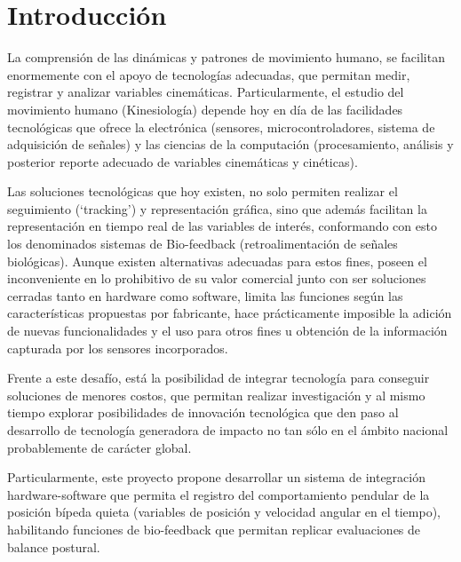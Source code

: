\documentclass[12pt,a4paper]{article}
\begin{document}
\tableofcontents %
\listoffigures
\listoftables

\thispagestyle{empty}
\pagebreak

\let\stdsection\section
\renewcommand\section{\newpage\stdsection}



\section{Introducción}
La comprensión de las dinámicas y patrones de movimiento humano, se facilitan enormemente con el apoyo de tecnologías adecuadas, que permitan medir, registrar y analizar variables cinemáticas. Particularmente, el estudio del movimiento humano (Kinesiología) depende hoy en día de las facilidades tecnológicas que ofrece la electrónica (sensores, microcontroladores, sistema de adquisición de señales) y las ciencias de la computación (procesamiento, análisis y posterior reporte adecuado de  variables cinemáticas y cinéticas).  

Las soluciones tecnológicas que hoy existen, no solo permiten realizar el seguimiento (‘tracking’) y representación gráfica, sino que además facilitan la representación en tiempo real de las variables de interés, conformando con esto los denominados sistemas de Bio-feedback (retroalimentación de señales biológicas). Aunque existen alternativas adecuadas para estos fines, poseen el inconveniente en lo prohibitivo de su valor comercial junto con ser soluciones cerradas tanto en hardware como software, limita las funciones según las características propuestas por fabricante, hace prácticamente imposible la adición de nuevas funcionalidades y el uso para otros fines u obtención de la información capturada por los sensores incorporados.

Frente a este desafío, está la posibilidad de integrar tecnología para conseguir soluciones de menores costos, que permitan realizar investigación y al mismo tiempo explorar posibilidades de innovación tecnológica que den paso al desarrollo de tecnología generadora de impacto no tan sólo en el ámbito nacional probablemente de carácter global.

Particularmente, este proyecto propone desarrollar un sistema de integración hardware-software que permita el registro del comportamiento pendular de la posición bípeda quieta (variables de posición y velocidad angular en el tiempo), habilitando funciones de bio-feedback que permitan replicar evaluaciones de balance postural.
\end{document}
